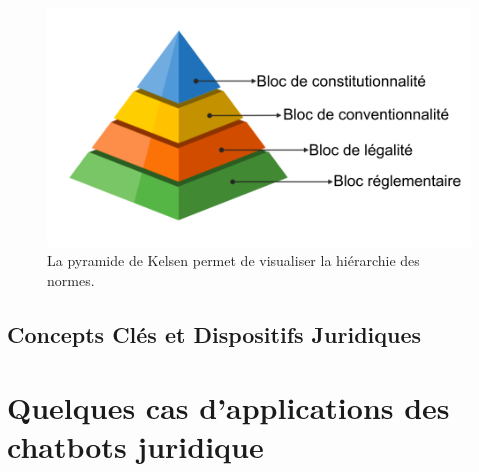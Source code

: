 \begin{figure}[H]
    \centering
    \includegraphics[width=15cm]{gfx/fig-law-pyramide.png}
    \caption{La pyramide de Kelsen permet de visualiser la hiérarchie des normes. \cite{frwiki:212163472}}
    \label{fig:datagenerated}
\end{figure}

\subsection{Concepts Clés et Dispositifs Juridiques}

\section{Quelques cas d'applications des chatbots juridique}

